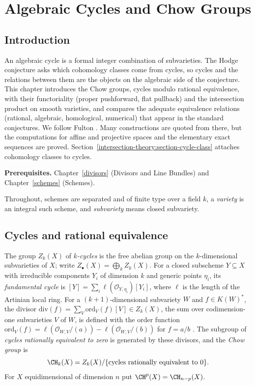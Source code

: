 \chapter{Algebraic Cycles and Chow Groups}\label{intersection-theory}

\section{Introduction}\label{intersection-theory:section-introduction}

An algebraic cycle is a formal integer combination of subvarieties. The Hodge conjecture asks which cohomology classes come from cycles, so cycles and the
relations between them are the objects on the algebraic side of the conjecture. This chapter introduces the Chow groups, cycles modulo rational
equivalence, with their functoriality (proper pushforward, flat pullback) and the intersection product on smooth varieties, and compares the adequate
equivalence relations (rational, algebraic, homological, numerical) that appear in the standard conjectures. We follow Fulton \cite{fulton-intersection}.
Many constructions are quoted from there, but the computations for affine and projective spaces and the elementary exact sequences are proved.
Section~\ref{intersection-theory:section-cycle-class} attaches cohomology classes to cycles.

\noindent\textbf{Prerequisites.} Chapter~\ref{divisors} (Divisors and Line Bundles) and Chapter~\ref{schemes} (Schemes).

Throughout, schemes are separated and of finite type over a field $k$, a \emph{variety} is an integral such scheme, and \emph{subvariety} means closed subvariety.

\section{Cycles and rational equivalence}\label{intersection-theory:section-chow-groups}

\begin{definition}\label{intersection-theory:definition-cycles}
The group $Z_k(X)$ of \emph{$k$-cycles} is the free abelian group on the $k$-dimensional subvarieties of $X$; write $Z_\bullet(X) = \bigoplus_kZ_k(X)$. For a closed subscheme
$Y \subseteq X$ with irreducible components $Y_i$ of dimension $k$ and generic points $\eta_i$, its \emph{fundamental cycle} is $[Y] = \sum_i\ell(\mathcal{O}_{Y,\eta_i})[Y_i]$, where $\ell$ is
the length of the Artinian local ring. For a $(k+1)$-dimensional subvariety $W$ and $f \in K(W)^*$, the divisor $\mathrm{div}(f) = \sum_V\mathrm{ord}_V(f)[V] \in Z_k(X)$, the sum over
codimension-one subvarieties $V$ of $W$, is defined with the order function $\mathrm{ord}_V(f) = \ell(\mathcal{O}_{W,V}/(a)) - \ell(\mathcal{O}_{W,V}/(b))$ for $f = a/b$ \cite[Section 1.2]{fulton-intersection}.
The subgroup of \emph{cycles rationally equivalent to zero} is generated by these divisors, and the \emph{Chow group} is
\[
\CH_k(X) = Z_k(X)/\{\text{cycles rationally equivalent to } 0\}.
\]
For $X$ equidimensional of dimension $n$ put $\CH^p(X) = \CH_{n-p}(X)$.
\end{definition}

